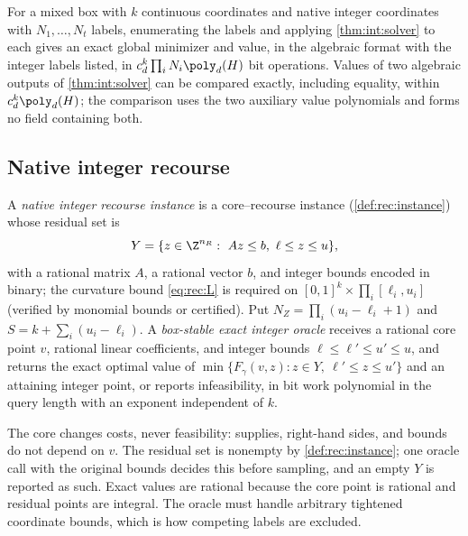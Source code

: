 \begin{corollary}\label{cor:int:mixed-solver}
For a mixed box with $k$ continuous coordinates and native integer
coordinates with $N_1,\ldots,N_t$ labels, enumerating the labels and applying
\cref{thm:int:solver} to each gives an exact global minimizer and value, in
the algebraic format with the integer labels listed, in
$c_d^k\prod_iN_i\poly_d(H)$ bit operations. Values of two algebraic outputs
of \cref{thm:int:solver} can be compared exactly, including equality, within
$c_d^k\poly_d(H)$; the comparison uses the two auxiliary value polynomials
and forms no field containing both.
\end{corollary}

\subsection{Native integer recourse}\label{sec:int:native}

\begin{definition}\label{def:int:native}
A \emph{native integer recourse instance} is a core--recourse instance
(\cref{def:rec:instance}) whose residual set is
\[
 Y=\{z\in\Z^{n_R}:\ Az\le b,\ \ell\le z\le u\},
\]
with a rational matrix $A$, a rational vector $b$, and integer bounds
encoded in binary; the curvature bound \eqref{eq:rec:L} is required on
$[0,1]^k\times\prod_i[\ell_i,u_i]$ (verified by monomial bounds or
certified). Put $N_Z=\prod_i(u_i-\ell_i+1)$ and $S=k+\sum_i(u_i-\ell_i)$. A
\emph{box-stable exact integer oracle} receives a rational core point $v$,
rational linear coefficients, and integer bounds $\ell\le\ell'\le u'\le u$,
and returns the exact optimal value of
$\min\{F_\gamma(v,z):z\in Y,\ \ell'\le z\le u'\}$ and an attaining integer
point, or reports infeasibility, in bit work polynomial in the query length
with an exponent independent of $k$.
\end{definition}

The core changes costs, never feasibility: supplies, right-hand sides, and
bounds do not depend on $v$. The residual set is nonempty by
\cref{def:rec:instance}; one oracle call with the original bounds decides
this before sampling, and an empty $Y$ is reported as such. Exact values are
rational because the core point is rational and residual points are
integral. The oracle must handle arbitrary tightened coordinate bounds,
which is how competing labels are excluded.

